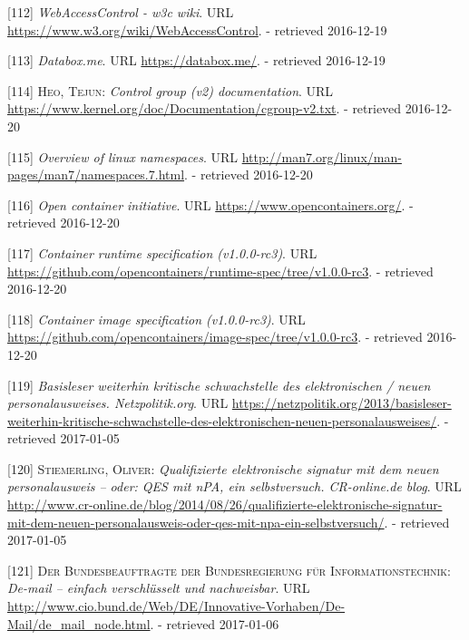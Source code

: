\documentclass[12pt,english,a4paper,titlepage,cleardoublepage=empty,dottedtoc]{report}
\begin{document}
\hypertarget{ref-web_2016_wiki_webaccesscontrol}{}
{[}112{]} \emph{WebAccessControl - w3c wiki}. URL
\url{https://www.w3.org/wiki/WebAccessControl}. - retrieved 2016-12-19

\hypertarget{ref-web_2016_demo_databox}{}
{[}113{]} \emph{Databox.me}. URL \url{https://databox.me/}. - retrieved
2016-12-19

\hypertarget{ref-web_2015_cgroup-doc}{}
{[}114{]} \textsc{Heo, Tejun}: \emph{Control group (v2) documentation}.
URL \url{https://www.kernel.org/doc/Documentation/cgroup-v2.txt}. -
retrieved 2016-12-20

\hypertarget{ref-web_2016_kernel-namespace}{}
{[}115{]} \emph{Overview of linux namespaces}. URL
\url{http://man7.org/linux/man-pages/man7/namespaces.7.html}. -
retrieved 2016-12-20

\hypertarget{ref-web_2016_open-container-initiative}{}
{[}116{]} \emph{Open container initiative}. URL
\url{https://www.opencontainers.org/}. - retrieved 2016-12-20

\hypertarget{ref-web_oci-spec_runtime}{}
{[}117{]} \emph{Container runtime specification (v1.0.0-rc3)}. URL
\url{https://github.com/opencontainers/runtime-spec/tree/v1.0.0-rc3}. -
retrieved 2016-12-20

\hypertarget{ref-web_oci-spec_image}{}
{[}118{]} \emph{Container image specification (v1.0.0-rc3)}. URL
\url{https://github.com/opencontainers/image-spec/tree/v1.0.0-rc3}. -
retrieved 2016-12-20

\hypertarget{ref-web_2013_npa-sicherheitsdefizit}{}
{[}119{]} \emph{Basisleser weiterhin kritische schwachstelle des
elektronischen / neuen personalausweises. Netzpolitik.org}. URL
\url{https://netzpolitik.org/2013/basisleser-weiterhin-kritische-schwachstelle-des-elektronischen-neuen-personalausweises/}.
- retrieved 2017-01-05

\hypertarget{ref-web_2014_test-qes-support-in-npa}{}
{[}120{]} \textsc{Stiemerling, Oliver}: \emph{Qualifizierte
elektronische signatur mit dem neuen personalausweis -- oder: QES mit
nPA, ein selbstversuch. CR-online.de blog}. URL
\url{http://www.cr-online.de/blog/2014/08/26/qualifizierte-elektronische-signatur-mit-dem-neuen-personalausweis-oder-qes-mit-npa-ein-selbstversuch/}.
- retrieved 2017-01-05

\hypertarget{ref-web_2017_about-de-mail}{}
{[}121{]} \textsc{Der Bundesbeauftragte der Bundesregierung für
Informationstechnik}: \emph{De-mail -- einfach verschlüsselt und
nachweisbar}. URL
\url{http://www.cio.bund.de/Web/DE/Innovative-Vorhaben/De-Mail/de_mail_node.html}.
- retrieved 2017-01-06
\end{document}
